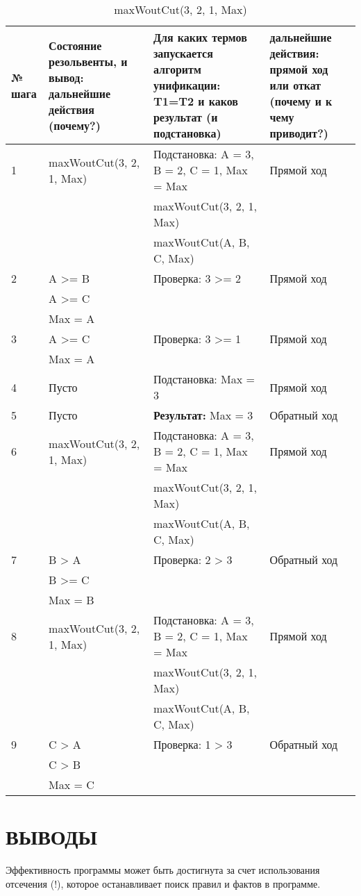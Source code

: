{
\small
\begin{longtable}{|p{1.15cm}|p{4cm}|p{6cm}|p{6cm}|}
    \caption{maxWoutCut(3, 2, 1, Max)} \\
    \hline
    № шага & Состояние резольвенты, и вывод: дальнейшие действия (почему?) & Для каких термов запускается алгоритм унификации: T1=T2 и каков результат (и подстановка) & дальнейшие действия: прямой ход или откат (почему и к чему приводит?) \\
    \hline
    1 & maxWoutCut(3, 2, 1, Max) & Подстановка: A = 3, B = 2, C = 1, Max = Max & Прямой ход \\
      & & maxWoutCut(3, 2, 1, Max) & \\
      & & maxWoutCut(A, B, C, Max) & \\
    \hline
    2 & A >= B & Проверка: 3 >= 2 & Прямой ход \\
      & A >= C & & \\
      & Max = A & & \\
    \hline
    3 & A >= C & Проверка: 3 >= 1 & Прямой ход \\
      & Max = A & & \\
    \hline
    4 & Пусто & Подстановка: Max = 3 & Прямой ход \\
    \hline
    5 & Пусто & \textbf{Результат:} Max = 3 & Обратный ход \\
    \hline
    6 & maxWoutCut(3, 2, 1, Max) & Подстановка: A = 3, B = 2, C = 1, Max = Max & Прямой ход \\
      & & maxWoutCut(3, 2, 1, Max) & \\
      & & maxWoutCut(A, B, C, Max) & \\
    \hline
    7 & B > A & Проверка: 2 > 3 & Обратный ход \\
      & B >= C & & \\
      & Max = B & & \\
    \hline
    8 & maxWoutCut(3, 2, 1, Max) & Подстановка: A = 3, B = 2, C = 1, Max = Max & Прямой ход \\
      & & maxWoutCut(3, 2, 1, Max) & \\
      & & maxWoutCut(A, B, C, Max) & \\
    \hline
    9 & C > A & Проверка: 1 > 3 & Обратный ход \\
      & C > B & & \\
      & Max = C & & \\
    \hline
\end{longtable}
}

\section{ВЫВОДЫ}

Эффективность программы может быть достигнута за счет использования отсечения (!), которое останавливает поиск правил и фактов в программе.
